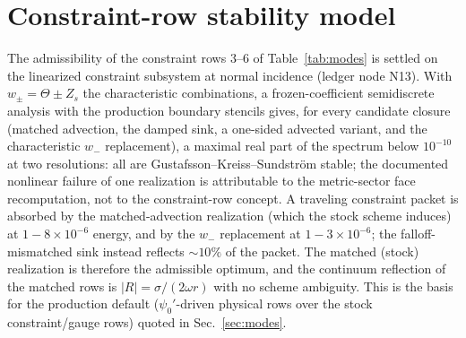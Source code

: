 \section{Constraint-row stability model}
\label{app:gks}

The admissibility of the constraint rows 3--6 of Table~\ref{tab:modes}
is settled on the linearized constraint subsystem at normal incidence
(ledger node N13). With $w_\pm = \Theta \pm Z_s$ the characteristic
combinations, a frozen-coefficient semidiscrete analysis with the
production boundary stencils gives, for every candidate closure (matched
advection, the damped sink, a one-sided advected variant, and the
characteristic $w_-$ replacement), a maximal real part of the spectrum
below $10^{-10}$ at two resolutions: all are Gustafsson--Kreiss--Sundstr\"om
stable; the documented nonlinear failure of one realization is
attributable to the metric-sector face recomputation, not to the
constraint-row concept. A traveling constraint packet is absorbed by the
matched-advection realization (which the stock scheme induces) at
$1 - 8\times10^{-6}$ energy, and by the $w_-$ replacement at
$1 - 3\times10^{-6}$; the falloff-mismatched sink instead reflects
$\sim\!10\%$ of the packet. The matched (stock) realization is therefore
the admissible optimum, and the continuum reflection of the matched rows
is $|R| = \sigma/(2\omega r)$ with no scheme ambiguity. This is the
basis for the production default ($\psi_0'$-driven physical rows over the
stock constraint/gauge rows) quoted in Sec.~\ref{sec:modes}.
